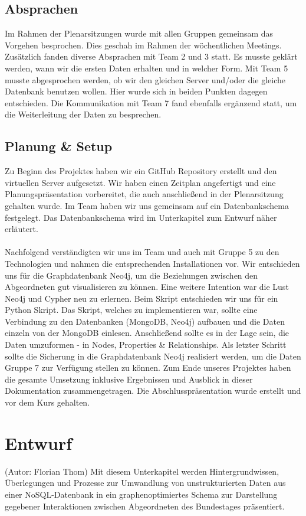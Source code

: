 \subsection{Absprachen}
Im Rahmen der Plenarsitzungen wurde mit allen Gruppen gemeinsam das Vorgehen besprochen. Dies geschah im Rahmen der wöchentlichen Meetings. Zusätzlich fanden diverse Absprachen mit Team 2 und 3 statt. Es musste geklärt werden, wann wir die ersten Daten erhalten und in welcher Form. Mit Team 5 musste abgesprochen werden, ob wir den gleichen Server und/oder die gleiche Datenbank benutzen wollen. Hier wurde sich in beiden Punkten dagegen entschieden. Die Kommunikation mit Team 7 fand ebenfalls ergänzend statt, um die Weiterleitung der Daten zu besprechen.
\subsection{Planung \& Setup}
Zu Beginn des Projektes haben wir ein GitHub Repository erstellt und den virtuellen Server aufgesetzt. Wir haben einen Zeitplan angefertigt und eine Planungspräsentation vorbereitet, die auch anschließend in der Plenarsitzung gehalten wurde. Im Team haben wir uns gemeinsam auf ein Datenbankschema festgelegt. Das Datenbankschema wird im Unterkapitel zum Entwurf näher erläutert.\\
\\
Nachfolgend verständigten wir uns im Team und auch mit Gruppe 5 zu den Technologien und nahmen die entsprechenden Installationen vor. Wir entschieden uns für die Graphdatenbank Neo4j, um die Beziehungen zwischen den Abgeordneten gut visualisieren zu können. Eine weitere Intention war die Lust Neo4j und Cypher neu zu erlernen. Beim Skript entschieden wir uns für ein Python Skript. Das Skript, welches zu implementieren war, sollte eine Verbindung zu den Datenbanken (MongoDB, Neo4j) aufbauen und die Daten einzeln von der MongoDB einlesen. Anschließend sollte es in der Lage sein, die Daten umzuformen - in Nodes, Properties \& Relationships. Als letzter Schritt sollte die Sicherung in die Graphdatenbank Neo4j realisiert werden, um die Daten Gruppe 7 zur Verfügung stellen zu können. Zum Ende unseres Projektes haben die gesamte Umsetzung inklusive Ergebnissen und Ausblick in dieser Dokumentation zusammengetragen. Die Abschlusspräsentation wurde erstellt und vor dem Kurs gehalten.
\section{Entwurf}
(Autor: Florian Thom)
\newline
\newline
Mit diesem Unterkapitel werden Hintergrundwissen, Überlegungen und Prozesse zur Umwandlung von unstrukturierten Daten aus einer NoSQL-Daten\-bank in ein graphenoptimiertes Schema zur Darstellung gegebener Interaktionen zwischen Abgeordneten des Bundestages präsentiert.
